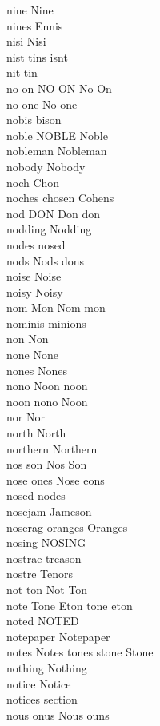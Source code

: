nine Nine\\
nines Ennis\\
nisi Nisi\\
nist tins isnt\\
nit tin\\
no on NO ON No On\\
no-one No-one\\
nobis bison\\
noble NOBLE Noble\\
nobleman Nobleman\\
nobody Nobody\\
noch Chon\\
noches chosen Cohens\\
nod DON Don don\\
nodding Nodding\\
nodes nosed\\
nods Nods dons\\
noise Noise\\
noisy Noisy\\
nom Mon Nom mon\\
nominis minions\\
non Non\\
none None\\
nones Nones\\
nono Noon noon\\
noon nono Noon\\
nor Nor\\
north North\\
northern Northern\\
nos son Nos Son\\
nose ones Nose eons\\
nosed nodes\\
nosejam Jameson\\
noserag oranges Oranges\\
nosing NOSING\\
nostrae treason\\
nostre Tenors\\
not ton Not Ton\\
note Tone Eton tone eton\\
noted NOTED\\
notepaper Notepaper\\
notes Notes tones stone Stone\\
nothing Nothing\\
notice Notice\\
notices section\\
nous onus Nous ouns\\
